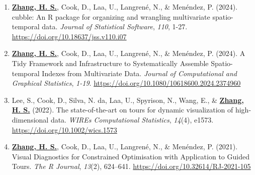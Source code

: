 \documentclass[10pt,a4paper]{article} %
\begin{document}


\vspace{-1em}
\begin{enumerate}[itemsep=0.1em]

    \item \underline{\textbf{Zhang, H. S.}}, Cook, D., Laa, U., Langren\'e, N., \& Men\'endez, P. (2024). 
    cubble: An R package for organizing and wrangling multivariate spatio-temporal data. 
    \emph{Journal of Statistical Software}, \emph{110}, 1-27. \url{https://doi.org/10.18637/jss.v110.i07}

    \item \underline{\textbf{Zhang, H. S.}}, Cook, D., Laa, U., Langren\'e, N., \& Men\'endez, P. (2024). 
    A Tidy Framework and Infrastructure to Systematically Assemble Spatio-temporal Indexes 
    from Multivariate Data. \emph{Journal of Computational and Graphical Statistics}, 
    \emph{1-19}. \url{https://doi.org/10.1080/10618600.2024.2374960}
    
    \item Lee, S., Cook, D., Silva, N. da, Laa, U., Spyrison, N., Wang, E., \& 
    \underline{\textbf{Zhang, H. S.}} (2022). The state-of-the-art on tours for 
    dynamic visualization of high-dimensional data. \emph{WIREs Computational Statistics}, 
    \emph{14}(4), e1573. \url{https://doi.org/10.1002/wics.1573}
    
    \item \underline{\textbf{Zhang, H. S.}}, Cook, D., Laa, U., Langren\'e, N., \& Men\'endez, P. (2021). 
    Visual Diagnostics for Constrained Optimisation with Application to Guided Tours. 
    \emph{The R Journal}, \emph{13}(2), 624--641. \url{https://doi.org/10.32614/RJ-2021-105}
    

\end{enumerate}
\end{document}
